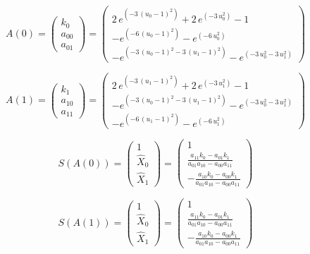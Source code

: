 \documentclass{article}
\begin{document}
\[
  A\left(0\right) = \left(\begin{array}{r}
k_{0} \\
a_{00} \\
a_{01}
\end{array}\right) = \left(\begin{array}{r}
2 \, e^{\left(-3 \, {\left(u_{0} - 1\right)}^{2}\right)} + 2 \, e^{\left(-3 \, u_{0}^{2}\right)} - 1 \\
-e^{\left(-6 \, {\left(u_{0} - 1\right)}^{2}\right)} - e^{\left(-6 \, u_{0}^{2}\right)} \\
-e^{\left(-3 \, {\left(u_{0} - 1\right)}^{2} - 3 \, {\left(u_{1} - 1\right)}^{2}\right)} - e^{\left(-3 \, u_{0}^{2} - 3 \, u_{1}^{2}\right)}
\end{array}\right)
\]

\[
  A\left(1\right) = \left(\begin{array}{r}
k_{1} \\
a_{10} \\
a_{11}
\end{array}\right) = \left(\begin{array}{r}
2 \, e^{\left(-3 \, {\left(u_{1} - 1\right)}^{2}\right)} + 2 \, e^{\left(-3 \, u_{1}^{2}\right)} - 1 \\
-e^{\left(-3 \, {\left(u_{0} - 1\right)}^{2} - 3 \, {\left(u_{1} - 1\right)}^{2}\right)} - e^{\left(-3 \, u_{0}^{2} - 3 \, u_{1}^{2}\right)} \\
-e^{\left(-6 \, {\left(u_{1} - 1\right)}^{2}\right)} - e^{\left(-6 \, u_{1}^{2}\right)}
\end{array}\right)
\]

\[
  S\left(A\left(0\right)\right) = \left(\begin{array}{r}
1 \\
\hat{X}_{0} \\
\hat{X}_{1}
\end{array}\right) = \left(\begin{array}{r}
1 \\
\frac{a_{11} k_{0} - a_{01} k_{1}}{a_{01} a_{10} - a_{00} a_{11}} \\
-\frac{a_{10} k_{0} - a_{00} k_{1}}{a_{01} a_{10} - a_{00} a_{11}}
\end{array}\right)
\]

\[
  S\left(A\left(1\right)\right) = \left(\begin{array}{r}
1 \\
\hat{X}_{0} \\
\hat{X}_{1}
\end{array}\right) = \left(\begin{array}{r}
1 \\
\frac{a_{11} k_{0} - a_{01} k_{1}}{a_{01} a_{10} - a_{00} a_{11}} \\
-\frac{a_{10} k_{0} - a_{00} k_{1}}{a_{01} a_{10} - a_{00} a_{11}}
\end{array}\right)
\]
\end{document}
